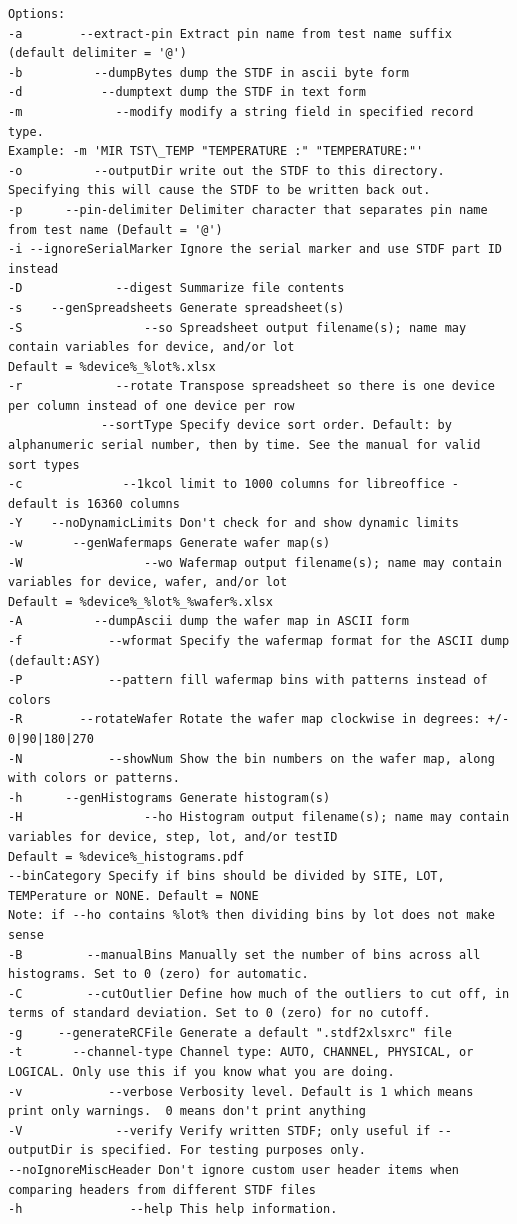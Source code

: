 \documentclass[letterpaper]{article}
\begin{document}
\begin{verbatim}
Options:
-a        --extract-pin Extract pin name from test name suffix (default delimiter = '@')
-b          --dumpBytes dump the STDF in ascii byte form
-d           --dumptext dump the STDF in text form
-m             --modify modify a string field in specified record type.
Example: -m 'MIR TST\_TEMP "TEMPERATURE :" "TEMPERATURE:"'
-o          --outputDir write out the STDF to this directory. Specifying this will cause the STDF to be written back out.
-p      --pin-delimiter Delimiter character that separates pin name from test name (Default = '@')
-i --ignoreSerialMarker Ignore the serial marker and use STDF part ID instead
-D             --digest Summarize file contents
-s    --genSpreadsheets Generate spreadsheet(s)
-S                 --so Spreadsheet output filename(s); name may contain variables for device, and/or lot
Default = %device%_%lot%.xlsx
-r             --rotate Transpose spreadsheet so there is one device per column instead of one device per row
             --sortType Specify device sort order. Default: by alphanumeric serial number, then by time. See the manual for valid sort types
-c              --1kcol limit to 1000 columns for libreoffice - default is 16360 columns
-Y    --noDynamicLimits Don't check for and show dynamic limits
-w       --genWafermaps Generate wafer map(s)
-W                 --wo Wafermap output filename(s); name may contain variables for device, wafer, and/or lot
Default = %device%_%lot%_%wafer%.xlsx
-A          --dumpAscii dump the wafer map in ASCII form
-f            --wformat Specify the wafermap format for the ASCII dump (default:ASY)
-P            --pattern fill wafermap bins with patterns instead of colors
-R        --rotateWafer Rotate the wafer map clockwise in degrees: +/- 0|90|180|270
-N            --showNum Show the bin numbers on the wafer map, along with colors or patterns.
-h      --genHistograms Generate histogram(s)
-H                 --ho Histogram output filename(s); name may contain variables for device, step, lot, and/or testID
Default = %device%_histograms.pdf
--binCategory Specify if bins should be divided by SITE, LOT, TEMPerature or NONE. Default = NONE
Note: if --ho contains %lot% then dividing bins by lot does not make sense
-B         --manualBins Manually set the number of bins across all histograms. Set to 0 (zero) for automatic.
-C         --cutOutlier Define how much of the outliers to cut off, in terms of standard deviation. Set to 0 (zero) for no cutoff.
-g     --generateRCFile Generate a default ".stdf2xlsxrc" file
-t       --channel-type Channel type: AUTO, CHANNEL, PHYSICAL, or LOGICAL. Only use this if you know what you are doing.
-v            --verbose Verbosity level. Default is 1 which means print only warnings.  0 means don't print anything
-V             --verify Verify written STDF; only useful if --outputDir is specified. For testing purposes only.
--noIgnoreMiscHeader Don't ignore custom user header items when comparing headers from different STDF files
-h               --help This help information.
\end{verbatim}
\endgroup
\end{document}
